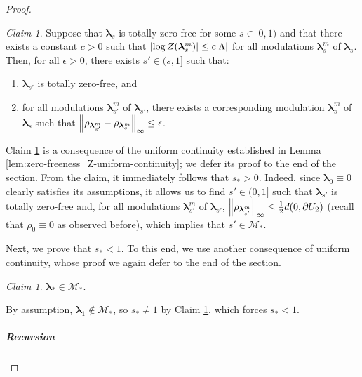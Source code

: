 \documentclass[11pt]{article}
\newcommand{\bl}{\bm{\lambda}}
\numberwithin{equation}{section}
\theoremstyle{plain}
\theoremstyle{definition}
\theoremstyle{remark}
\newtheorem{claim}[theorem]{Claim}
\begin{document}
\begin{proof}
\begin{claim}
\label{clm:zero-freeness_enlargement}
Suppose that $\bl_{s}$ is totally zero-free for some $s\in[0,1)$ and that there exists a constant $c>0$ such that $\abs{\log Z(\bl_{s}^{m})}\le c\abs{\Lambda}$ for all modulations $\bl_{s}^{m}$ of $\bl_{s}$.
Then, for all $\epsilon>0$, there exists $s'\in(s,1]$ such that:
\begin{enumerate}
\item $\bl_{s'}$ is totally zero-free, and \label{itm:zero-freeness_enlargement_1}
\item for all modulations $\bl_{s'}^{m}$ of $\bl_{s'}$, there exists a corresponding modulation $\bl_{s}^{m}$ of $\bl_{s}$ such that $\norm{\rho_{\bl_{s'}^{m}}-\rho_{\bl_{s}^{m}}}_{\infty}\le \epsilon$. \label{itm:zero-freeness_enlargement_2}
\end{enumerate}
\end{claim}

Claim \ref{clm:zero-freeness_enlargement} is a consequence of the uniform continuity established in Lemma \ref{lem:zero-freeness_Z-uniform-continuity}; we defer its proof to the end of the section.
From the claim, it immediately follows that $s_{\ast}>0$.
Indeed, since $\bl_{0}\equiv 0$ clearly satisfies its assumptions, it allows us to find $s'\in(0,1]$ such that $\bl_{s'}$ is totally zero-free and, for all modulations $\bl_{s'}^{m}$ of $\bl_{s'}$, $\norm{\rho_{\bl_{s'}^{m}}}_{\infty}\le\frac{1}{2}d(0,\partial U_{2})$ (recall that $\rho_{0}\equiv 0$ as observed before), which implies that $s'\in\mathcal{M}_{\ast}$.

Next, we prove that $s_{\ast}<1$.
To this end, we use another consequence of uniform continuity, whose proof we again defer to the end of the section.
\begin{claim}
\label{clm:zero-freeness_criticality}
$\bl_{\ast}\in\mathcal{M}_{\ast}$.
\end{claim}
By assumption, $\bl_{1}\not\in\mathcal{M}_{\ast}$, so $s_{\ast}\ne 1$ by Claim \ref{clm:zero-freeness_criticality}, which forces $s_{\ast}<1$.

\subparagraph{Recursion}


\end{proof}
\end{document}
